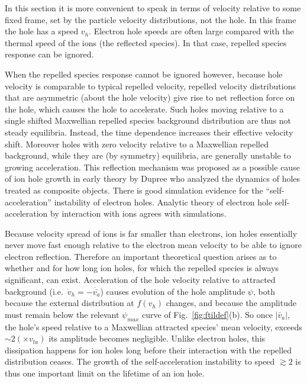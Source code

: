 \documentclass[aip,pop,article-title]{revtex4-2}
\begin{document}
In this section it is more convenient to speak in terms of velocity
relative to some fixed frame, set by the particle velocity
distributions, not the hole. In this frame the hole has a speed
$v_h$. Electron hole speeds are often large compared with the thermal
speed of the ions (the reflected species). In that case, repelled
species response can be ignored.

When the repelled species response cannot be ignored however, because
hole velocity is comparable to typical repelled velocity, repelled
velocity distributions that are asymmetric (about the hole velocity)
give rise to net reflection force on the hole, which causes the hole
to accelerate. Such holes moving relative to a single shifted
Maxwellian repelled species background distribution are thus not
steady equilibria. Instead, the time dependence increases their
effective velocity shift. Moreover holes with zero velocity relative
to a Maxwellian repelled background, while they are (by symmetry)
equilibria, are generally unstable to growing acceleration. This
reflection mechanism was proposed as a possible cause of ion hole
growth in early theory by Dupree\cite{Dupree1982,Dupree1983} who
analyzed the dynamics of holes treated as composite objects. There is
good simulation evidence for the ``self-acceleration'' instability of
electron holes\cite{Eliasson2004,Eliasson2006}. Analytic theory of
electron hole self-acceleration by interaction with ions agrees with
simulations\cite{Zhou2016}.

Because velocity spread of ions is far smaller than electrons, ion
holes essentially never move fast enough relative to the electron mean
velocity to be able to ignore electron reflection.  Therefore an
important theoretical question arises as to whether and for how long
ion holes, for which the repelled species is always significant, can
exist. Acceleration of the hole velocity relative to attracted
background (i.e.\ $\dot v_h=-\dot{\bar{v_a}}$) causes evolution of the hole
amplitude ${\psi}$, both because the external distribution at $f(v_h)$
changes, and because the amplitude must remain below the relevant
${\psi}_{max}$ curve of Fig.\ \ref{fig:ftildef}(b). So once $|\bar v_a|$,
the hole's speed relative to a Maxwellian attracted species' mean
velocity, exceeds $\sim 2(\times v_{ta})$ its amplitude becomes
negligible. Unlike electron holes, this dissipation happens for ion
holes long before their interaction with the repelled distribution
ceases. The growth of the self-acceleration instability to speed
$\gtrsim 2$ is thus one important limit on the lifetime of an ion
hole.
\end{document}
